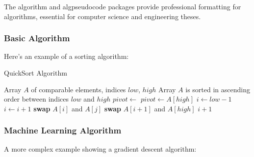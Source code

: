 The algorithm and algpseudocode packages provide professional formatting for algorithms, essential for computer science and engineering theses.

\subsubsection{Basic Algorithm}

Here's an example of a sorting algorithm:

\begin{algorithm}[htbp]
    \caption{QuickSort Algorithm}
    \label{alg:quicksort}
    \begin{algorithmic}[1]
        \Require Array $A$ of comparable elements, indices $low$, $high$
        \Ensure Array $A$ is sorted in ascending order between indices $low$ and $high$
        \State $pivot \gets$ 
        \State {}
        \State {}
        \EndIf
        \EndProcedure
        \State $pivot \gets A[high]$
        \State $i \gets low - 1$
        \State $i \gets i + 1$
        \State \textbf{swap} $A[i]$ and $A[j]$
        \EndIf
        \EndFor
        \State \textbf{swap} $A[i + 1]$ and $A[high]$
        \State \Return $i + 1$
        \EndProcedure
    \end{algorithmic}
\end{algorithm}

\subsubsection{Machine Learning Algorithm}

A more complex example showing a gradient descent algorithm:

